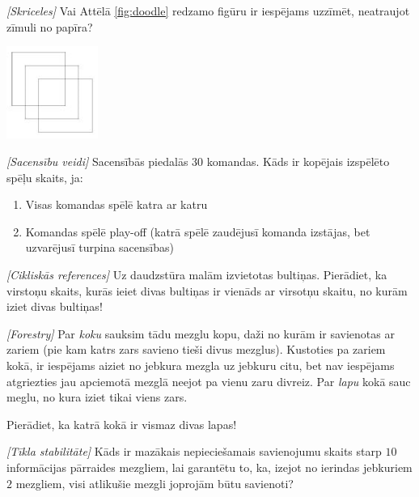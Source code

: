 \begin{problem}
\textit{[Skriceles]}
Vai Attēlā \ref{fig:doodle} redzamo figūru ir iespējams uzzīmēt, neatraujot zīmuli no papīra?
\begin{center}
\includegraphics[width=3cm]{doodle.png}
\label{fig:doodle}
\end{center} 
\end{problem}
%

\begin{problem}
\textit{[Sacensību veidi]}
Sacensībās piedalās $30$ komandas. Kāds ir kopējais izspēlēto spēļu skaits, ja:
\begin{enumerate}
\item Visas komandas spēlē katra ar katru
\item Komandas spēlē play-off (katrā spēlē zaudējusī komanda izstājas, bet uzvarējusī turpina sacensības)
\end{enumerate}
\end{problem}
%

\begin{problem}
\textit{[Cikliskās references]}
Uz daudzstūra malām izvietotas bultiņas. Pierādiet, ka virstoņu skaits, kurās ieiet divas bultiņas ir vienāds ar virsotņu skaitu, no kurām iziet divas bultiņas!
\end{problem}
%

\begin{problem}
\textit{[Forestry]}
Par \textit{koku} sauksim tādu mezglu kopu, daži no kurām ir savienotas ar zariem (pie kam katrs zars savieno tieši divus mezglus). Kustoties pa zariem kokā, ir iespējams aiziet no jebkura mezgla uz jebkuru citu, bet nav iespējams atgriezties jau apciemotā mezglā neejot pa vienu zaru divreiz. Par \textit{lapu} kokā sauc meglu, no kura iziet tikai viens zars. 

Pierādiet, ka katrā kokā ir vismaz divas lapas!

\end{problem}
%

\begin{problem}
\textit{[Tīkla stabilitāte]}
Kāds ir mazākais nepieciešamais savienojumu skaits starp $10$ informācijas pārraides mezgliem, lai garantētu to, ka, izejot no ierindas jebkuriem $2$ mezgliem, visi atlikušie mezgli joprojām būtu savienoti?
\end{problem}
%



